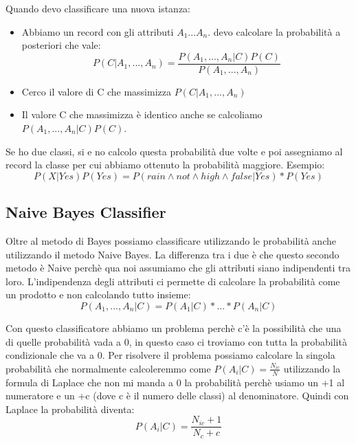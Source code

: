 \documentclass[14pt]{extreport}
\begin{document}
Quando devo classificare una nuova istanza:

\begin{itemize}
    \item Abbiamo un record con gli attributi $A_1...A_n$. devo calcolare la probabilità a posteriori che vale:
    \begin{equation}
        P(C|A_1,...,A_n) = \frac{P(A_1,...,A_n|C)P(C)}{P(A_1,...,A_n)}
    \end{equation}
    \item Cerco il valore di C che massimizza $P(C|A_1,...,A_n)$
    \item Il valore C che massimizza è identico anche se calcoliamo $P(A_1,...,A_n|C)P(C)$. 
\end{itemize}

Se ho due classi, si e no calcolo questa probabilità due volte e poi assegniamo al record la classe per cui abbiamo ottenuto la probabilità maggiore.
Esempio:
\begin{equation}
    P(X|Yes)P(Yes) = P(rain \land not \land high \land false|Yes)*P(Yes)
\end{equation}

\subsection{Naive Bayes Classifier}

Oltre al metodo di Bayes possiamo classificare utilizzando le probabilità anche utilizzando il metodo Naive Bayes.
La differenza tra i due è che questo secondo metodo è Naive perchè qua noi assumiamo che gli attributi siano indipendenti tra loro.
L'indipendenza degli attributi ci permette di calcolare la probabilità come un prodotto e non calcolando tutto insieme:
\begin{equation}
P(A_1,...,A_n | C) = P(A_1 | C) * ... * P(A_n | C)
\end{equation}

Con questo classificatore abbiamo un problema perchè c'è la possibilità che una di quelle probabilità vada a 0, in questo caso ci troviamo con tutta la probabilità condizionale che va a 0.
Per risolvere il problema possiamo calcolare la singola probabilità che normalmente calcoleremmo come $P(A_i|C) = \frac{N_{ic}}{N}$ utilizzando la formula di Laplace che non mi manda a 0 la probabilità perchè usiamo un +1 al numeratore e un +c (dove c è il numero delle classi) al denominatore. Quindi con Laplace la probabilità diventa:
\begin{equation}
P(A_i | C) = \frac{N_{ic}+1}{N_c + c}
\end{equation}
\end{document}
